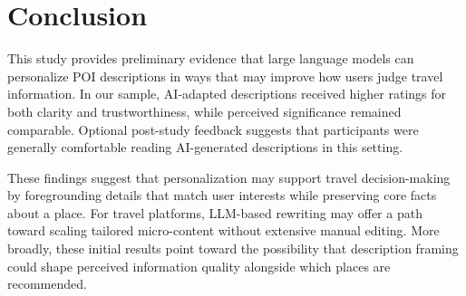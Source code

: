 \section{Conclusion}

This study provides preliminary evidence that large language models can personalize POI descriptions in ways that may improve how users judge travel information. In our sample, AI-adapted descriptions received higher ratings for both clarity and trustworthiness, while perceived significance remained comparable. Optional post-study feedback suggests that participants were generally comfortable reading AI-generated descriptions in this setting.

These findings suggest that personalization may support travel decision-making by foregrounding details that match user interests while preserving core facts about a place. For travel platforms, LLM-based rewriting may offer a path toward scaling tailored micro-content without extensive manual editing. More broadly, these initial results point toward the possibility that description framing could shape perceived information quality alongside which places are recommended.
